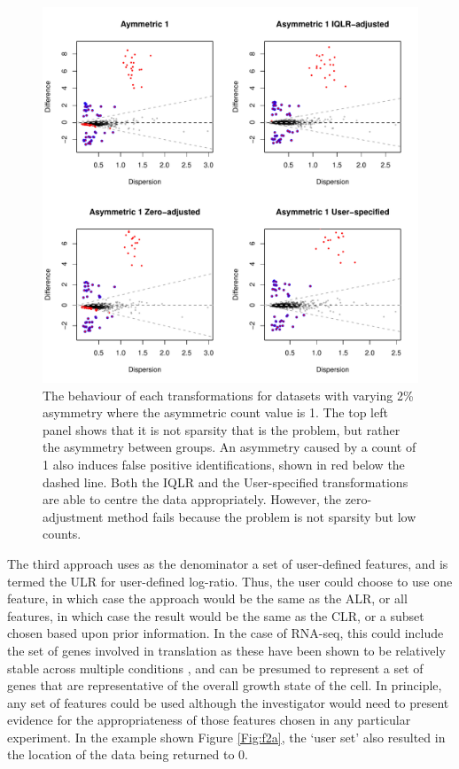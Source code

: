 \documentclass[10pt]{article}
\begin{document}
\begin{figure}[!t]
\includegraphics[width=5in]{Fig_ones.pdf}
\caption{The behaviour of each transformations for datasets with varying 2\% asymmetry where the asymmetric count value is 1. The top left panel shows that it is not sparsity that is the problem, but rather the asymmetry  between groups. An asymmetry caused by a count of 1 also induces false positive identifications, shown in red below the dashed line. Both the IQLR and the User-specified transformations are able to centre the data appropriately. However, the zero-adjustment method fails because the problem is not sparsity but low counts.}
\label{Fig:ones}
\end{figure}


The  third  approach uses as the denominator a set of user-defined features, and is termed the ULR for user-defined log-ratio. Thus, the user could choose to use one feature, in which case the approach would be the same as the ALR, or all features, in which case the result would be the same as the CLR, or a subset chosen based upon prior information. In the case of RNA-seq, this could include the set of genes involved in translation as these have been shown to be relatively stable across multiple conditions , and can be presumed to represent a set of genes that are representative of the overall growth state of the cell. In principle, any set of features could be used although the investigator would need to present evidence for the  appropriateness of those features chosen in any particular experiment. In the example shown Figure \ref{Fig:f2a}, the `user set' also resulted in the location of the data being returned to 0. 
\end{document}
